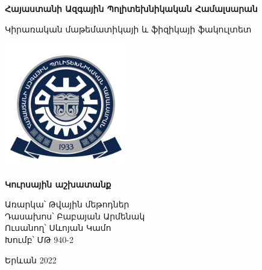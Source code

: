 \documentclass{article}
\begin{document}

\setmainfont{Arm Hmk's Light}



\begin{titlepage}
	\begin{center}
	
		\begin{LARGE}
		       \textbf{Հայաստանի Ազգային Պոլիտեխնիկական Համալսարան}
		\end{LARGE}
		
		       \vspace{0.5cm}
		
		\begin{Large}
		        Կիրառական մաթեմատիկայի և ֆիզիկայի ֆակուլտետ
		\end{Large}		            
		
		       \vspace{0.8cm}
		     
		\includegraphics[width=0.4\textwidth]{university}


		       \vspace{1.5cm}
		
		\begin{huge}
		       \textbf{Կուրսային  աշխատանք}
		\end{huge}


	
	\end{center}


	\vspace{4cm}

	\begin{flushleft}
	\begin{large}
		Առարկա՝    Թվային մեթոդներ\\
		Դասախոս՝  Բաբայան Արմենակ\\
		Ուսանող՝     Սևոյան Կամո\\
		Խումբ՝         ՄԹ 940-2\\
	\end{large}
	\end{flushleft}



	\vfill

	\begin{center}
		Երևան 2022
	\end{center}

\end{titlepage}
\end{document}
